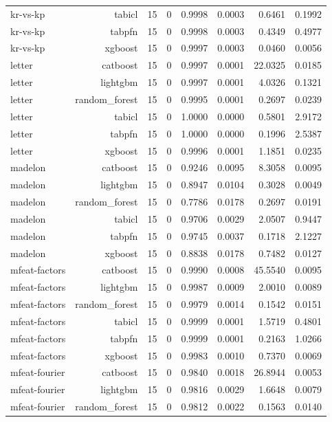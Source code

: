 \begin{table}[htbp]
\begin{tabular}{lrrrrrrr}
kr-vs-kp & tabicl & 15 & 0 & 0.9998 & 0.0003 & 0.6461 & 0.1992 \\
kr-vs-kp & tabpfn & 15 & 0 & 0.9998 & 0.0003 & 0.4349 & 0.4977 \\
kr-vs-kp & xgboost & 15 & 0 & 0.9997 & 0.0003 & 0.0460 & 0.0056 \\
letter & catboost & 15 & 0 & 0.9997 & 0.0001 & 22.0325 & 0.0185 \\
letter & lightgbm & 15 & 0 & 0.9997 & 0.0001 & 4.0326 & 0.1321 \\
letter & random\_forest & 15 & 0 & 0.9995 & 0.0001 & 0.2697 & 0.0239 \\
letter & tabicl & 15 & 0 & 1.0000 & 0.0000 & 0.5801 & 2.9172 \\
letter & tabpfn & 15 & 0 & 1.0000 & 0.0000 & 0.1996 & 2.5387 \\
letter & xgboost & 15 & 0 & 0.9996 & 0.0001 & 1.1851 & 0.0235 \\
madelon & catboost & 15 & 0 & 0.9246 & 0.0095 & 8.3058 & 0.0095 \\
madelon & lightgbm & 15 & 0 & 0.8947 & 0.0104 & 0.3028 & 0.0049 \\
madelon & random\_forest & 15 & 0 & 0.7786 & 0.0178 & 0.2697 & 0.0191 \\
madelon & tabicl & 15 & 0 & 0.9706 & 0.0029 & 2.0507 & 0.9447 \\
madelon & tabpfn & 15 & 0 & 0.9745 & 0.0037 & 0.1718 & 2.1227 \\
madelon & xgboost & 15 & 0 & 0.8838 & 0.0178 & 0.7482 & 0.0127 \\
mfeat-factors & catboost & 15 & 0 & 0.9990 & 0.0008 & 45.5540 & 0.0095 \\
mfeat-factors & lightgbm & 15 & 0 & 0.9987 & 0.0009 & 2.0010 & 0.0089 \\
mfeat-factors & random\_forest & 15 & 0 & 0.9979 & 0.0014 & 0.1542 & 0.0151 \\
mfeat-factors & tabicl & 15 & 0 & 0.9999 & 0.0001 & 1.5719 & 0.4801 \\
mfeat-factors & tabpfn & 15 & 0 & 0.9999 & 0.0001 & 0.2163 & 1.0266 \\
mfeat-factors & xgboost & 15 & 0 & 0.9983 & 0.0010 & 0.7370 & 0.0069 \\
mfeat-fourier & catboost & 15 & 0 & 0.9840 & 0.0018 & 26.8944 & 0.0053 \\
mfeat-fourier & lightgbm & 15 & 0 & 0.9816 & 0.0029 & 1.6648 & 0.0079 \\
mfeat-fourier & random\_forest & 15 & 0 & 0.9812 & 0.0022 & 0.1563 & 0.0140 \\

\end{tabular}
\end{table}
